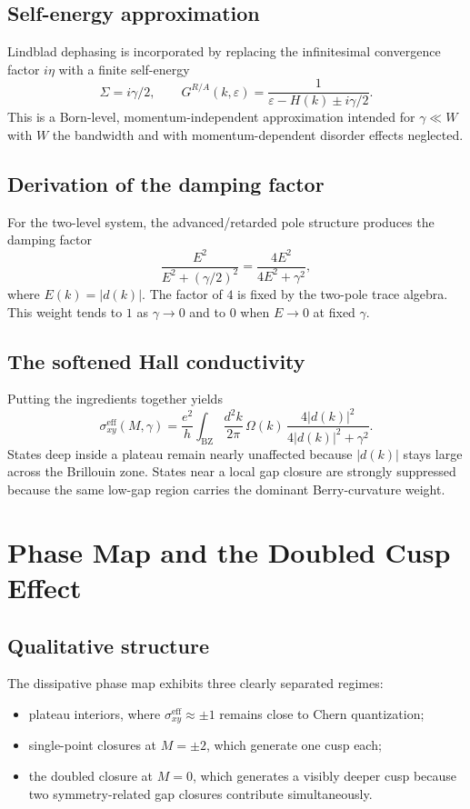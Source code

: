 \documentclass[11pt]{article}
\newcommand{\BZ}{\mathrm{BZ}}
\newcommand{\sigmaeff}{\sigma_{xy}^{\mathrm{eff}}}
\newcommand{\Ohm}{\Omega}
\begin{document}
\subsection{Self-energy approximation}

Lindblad dephasing is incorporated by replacing the infinitesimal convergence factor $i\eta$ with a finite self-energy
\[
\Sigma=i\gamma/2,
\qquad
G^{R/A}(k,\varepsilon)=\frac{1}{\varepsilon-H(k)\pm i\gamma/2}.
\]
This is a Born-level, momentum-independent approximation intended for $\gamma\ll W$ with $W$ the bandwidth and with momentum-dependent disorder effects neglected.

\subsection{Derivation of the damping factor}

For the two-level system, the advanced/retarded pole structure produces the damping factor
\[
\frac{E^2}{E^2+(\gamma/2)^2}
=\frac{4E^2}{4E^2+\gamma^2},
\]
where $E(k)=|d(k)|$. The factor of $4$ is fixed by the two-pole trace algebra. This weight tends to $1$ as $\gamma\to 0$ and to $0$ when $E\to 0$ at fixed $\gamma$.

\subsection{The softened Hall conductivity}

Putting the ingredients together yields
\[
\sigmaeff(M,\gamma)
=\frac{e^2}{h}\int_{\BZ}\frac{d^2k}{2\pi}\,
\Ohm(k)\,\frac{4|d(k)|^2}{4|d(k)|^2+\gamma^2}.
\]
States deep inside a plateau remain nearly unaffected because $|d(k)|$ stays large across the Brillouin zone. States near a local gap closure are strongly suppressed because the same low-gap region carries the dominant Berry-curvature weight.

\section{Phase Map and the Doubled Cusp Effect}

\subsection{Qualitative structure}

The dissipative phase map exhibits three clearly separated regimes:
\begin{itemize}
\item plateau interiors, where $\sigmaeff\approx \pm 1$ remains close to Chern quantization;
\item single-point closures at $M=\pm 2$, which generate one cusp each;
\item the doubled closure at $M=0$, which generates a visibly deeper cusp because two symmetry-related gap closures contribute simultaneously.
\end{itemize}
\end{document}
